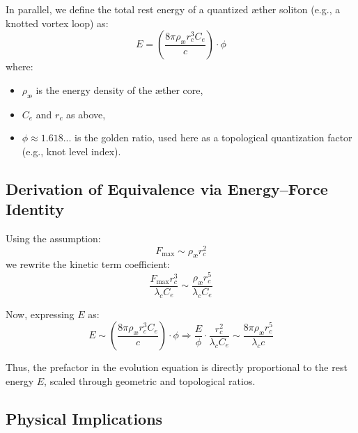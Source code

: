 \documentclass[a4paper,12pt]{article}
\begin{document}
            In parallel, we define the total rest energy of a quantized æther soliton (e.g., a knotted vortex loop) as:
            \begin{equation}
            E = \left( \frac{8\pi \rho_{\text{æ}} r_c^3 C_e}{c} \right) \cdot \phi
            \end{equation}
            where:
            \begin{itemize}
              \item $\rho_{\text{æ}}$ is the energy density of the æther core,
              \item $C_e$ and $r_c$ as above,
              \item $\phi \approx 1.618...$ is the golden ratio, used here as a topological quantization factor (e.g., knot level index).
            \end{itemize}

            \subsection{Derivation of Equivalence via Energy–Force Identity}

            Using the assumption:
            \begin{equation}
            F_{\max} \sim \rho_{\text{æ}} r_c^2
            \end{equation}
            we rewrite the kinetic term coefficient:
            \begin{equation}
            \frac{F_{\max} r_c^3}{\lambda_c C_e} \sim \frac{\rho_{\text{æ}} r_c^5}{\lambda_c C_e}
            \end{equation}

            Now, expressing $E$ as:
            \begin{equation}
            E \sim \left( \frac{8\pi \rho_{\text{æ}} r_c^3 C_e}{c} \right) \cdot \phi
            \Rightarrow
            \frac{E}{\phi} \cdot \frac{r_c^2}{\lambda_c C_e} \sim \frac{8\pi \rho_{\text{æ}} r_c^5}{\lambda_c c}
            \end{equation}

            Thus, the prefactor in the evolution equation is directly proportional to the rest energy $E$, scaled through geometric and topological ratios.

            \subsection{Physical Implications}
\end{document}
